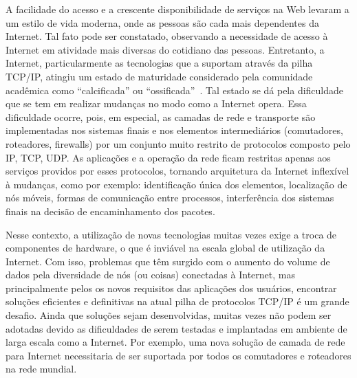 \documentclass[	12pt, Times, openright, twoside, a4paper, english, brazil]{abntex2}
\begin{document}
A facilidade do acesso e a crescente disponibilidade de serviços na Web levaram a um estilo de vida moderna, onde as pessoas são cada mais dependentes da Internet. Tal fato pode ser constatado, observando a necessidade de acesso à Internet em atividade mais diversas do cotidiano das pessoas. Entretanto, a Internet, particularmente as tecnologias que a suportam através da pilha TCP/IP, atingiu um estado de maturidade considerado pela comunidade acadêmica  como ``calcificada'' ou ``ossificada''~\cite{Zhang2010}. Tal estado se dá pela dificuldade que se tem em realizar mudanças no modo como a Internet opera. Essa dificuldade ocorre, pois, em especial, as camadas de rede e transporte são implementadas nos sistemas finais e nos elementos intermediários (comutadores, roteadores, firewalls) por um conjunto muito restrito de protocolos composto pelo IP, TCP, UDP. As aplicações e a operação da rede ficam restritas apenas aos serviços providos por esses protocolos, tornando arquitetura da Internet inflexível à mudanças, como por exemplo: identificação única dos elementos, localização de nós móveis, formas de comunicação entre processos, interferência dos sistemas finais na decisão de encaminhamento dos pacotes.

Nesse contexto, a utilização de novas tecnologias muitas vezes exige a troca de componentes de hardware, o que é inviável na escala global de utilização da Internet. Com isso, problemas que têm surgido com o aumento do volume de dados pela diversidade de nós (ou coisas) conectadas à Internet, mas principalmente pelos os novos requisitos das aplicações dos usuários, encontrar soluções eficientes e definitivas na atual pilha de protocolos TCP/IP é um grande desafio. Ainda que soluções sejam desenvolvidas, muitas vezes não podem ser adotadas devido as dificuldades de serem testadas e implantadas em ambiente de larga escala como a Internet. Por exemplo, uma nova solução de camada de rede para Internet necessitaria de ser suportada por todos os comutadores e roteadores na rede mundial.

\end{document}
